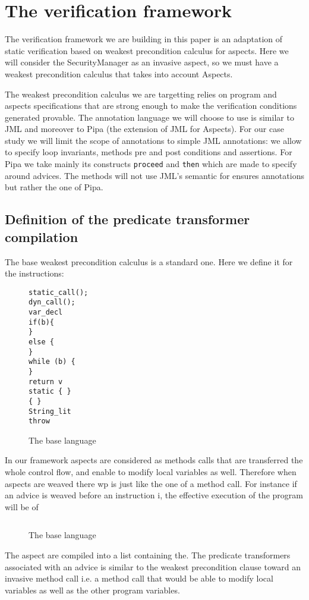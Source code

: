 \documentclass[draft]{llncs}
\begin{document}
\section{The verification framework}
The verification framework we are building in this paper is an adaptation of static
verification based on weakest precondition calculus for aspects. Here we will consider
the SecurityManager as an invasive aspect, so we must have a weakest precondition calculus that
 takes into account Aspects.

The weakest precondition calculus we are targetting relies on program and aspects specifications that are
strong enough to make the verification conditions generated provable.
The annotation language we will choose to use is similar to JML and moreover to Pipa (the extension
of JML for Aspects). For our case study we will limit the scope of annotations
to simple JML annotations: we allow to specify loop invariants, methods pre and post conditions
and assertions. For Pipa we take mainly its constructs {\tt proceed} and {\tt then} which are made to
specify around advices.
The methods will not use JML's semantic for ensures annotations but rather the one of Pipa.
\subsection{Definition of the predicate transformer compilation}

The base weakest precondition calculus is a standard one. Here we define it
for the instructions: 
\begin{figure}
\begin{small}\begin{verbatim}
static_call();
dyn_call();
var_decl
if(b){
}
else {
}
while (b) {
}
return v
static { }
{ }
String_lit
throw
\end{verbatim}
\end{small}
\caption{The base language}
\label{lang}
\end{figure}

In our framework aspects are considered as methods calls that are transferred the whole
control flow, and enable to modify local variables as well. Therefore when aspects are weaved
there wp is just like the one of a method call.
For instance if an advice is weaved before an instruction i, the effective execution of the program
will be of
\begin{figure}
\begin{small}\begin{verbatim}

\end{verbatim}
\end{small}
\caption{The base language}
\label{lang}
\end{figure}
The aspect are compiled into a list containing the.
The predicate transformers associated with an advice is similar to the weakest precondition
clause toward an invasive method call i.e. a method call that would be able to modify local variables
as well as the other program variables.
\end{document}
